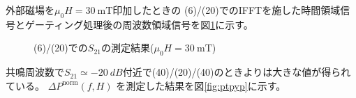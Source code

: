 \documentclass[dvipdfmx,11pt]{jsreport}
\numberwithin{equation}{chapter}
\numberwithin{table}{chapter}
\begin{document}
外部磁場を$\mu_0 H=\SI{30}{\milli \tesla}$印加したときの
(6)/(20)でのIFFTを施した時間領域信号とゲーティング処理後の周波数領域信号を図\ref{fig:k2}に示す。
\begin{figure}[H]
	\centering
    \caption{(6)/(20)での$S_{21}$の測定結果($\mu_0 H=\SI{30}{\milli \tesla}$)}
    \label{fig:k2}
\end{figure}
共鳴周波数で$S_{21}\simeq \SI{-20}{dB}$付近で(40)/(20)/(40)のときよりは大きな値が得られている。
$\Delta P^{\text{norm}}(f,H)$ を測定した結果を図\ref{fig:ptpyp}に示す。
\end{document}
